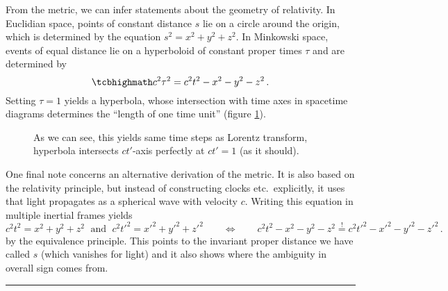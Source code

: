 From the metric, we can infer statements about the geometry of relativity. In Euclidian space, points of constant distance $s$ lie on a circle around the origin, which is determined by the equation $s^2 = x^2 + y^2 + z^2$. In Minkowski space, events of equal distance lie on a hyperboloid of constant proper times $\tau$ and are determined by
\begin{equation}\label{eq:eichhyperbel}
\eqbox{
c^2 \tau^2 = c^2 t^2 - x^2 - y^2 - z^2
} \, .
\end{equation}
Setting $\tau = 1$ yields a hyperbola, whose intersection with time axes in spacetime diagrams determines the \enquote{length of one time unit} (figure \ref{fig:minkowski_with_eichhyperbel}).


\begin{figure}
	\centering


	\caption{As we can see, this yields same time steps as Lorentz transform, hyperbola intersects $ct'$-axis perfectly at $c t' = 1$ (as it should).}
	\label{fig:minkowski_with_eichhyperbel}
\end{figure}


One final note concerns an alternative derivation of the metric. It is also based on the relativity principle, but instead of constructing clocks etc.~explicitly, it uses that light propagates as a spherical wave with velocity $c$. Writing this equation in multiple inertial frames yields
\begin{equation}
c^2 t^2 = x^2 + y^2 + z^2 \; \text{ and } \; c^2 t'^2 = x'^2 + y'^2 + z'^2 \qquad \Leftrightarrow \qquad c^2 t^2 - x^2 - y^2 - z^2 \overset{!}{=} c^2 t'^2 - x'^2 - y'^2 - z'^2 \, .
\end{equation}
by the equivalence principle. This points to the invariant proper distance we have called $s$ (which vanishes for light) and it also shows where the ambiguity in overall sign comes from.




\hrule


